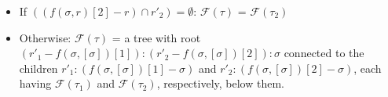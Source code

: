 {\begin{definition}
\begin{itemize}
\begin{itemize}
             If $((f(\sigma,r)[1] - r)\cap r'_1)  = \emptyset $:
             $\mathcal{F}(\tau) $ = $\mathcal{F}(\tau_1) $
             \item 
             If $((f(\sigma,r)[2] - r)\cap r'_2)  = \emptyset $:
             $\mathcal{F}(\tau) $ = $\mathcal{F}(\tau_2) $
             \item Otherwise:  
             $\mathcal{F}(\tau) $ = a tree with root $(r'_1 - f(\sigma,[\sigma])[1]) : (r'_2 - f(\sigma,[\sigma])[2]):\sigma$  connected to the children $r'_1 :(f(\sigma,[\sigma])[1]-\sigma)$  and $r'_2 :(f(\sigma,[\sigma])[2]-\sigma)$, each having 
             $\mathcal{F}(\tau_1)$ and $\mathcal{F}(\tau_2)$, respectively, below them. 
        \end{itemize}
    

    \end{itemize}
\end{definition}
}




